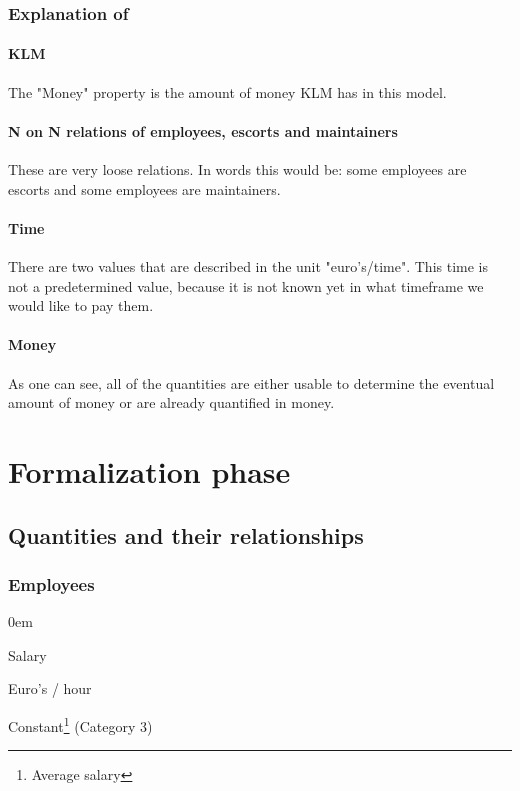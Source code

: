 \documentclass[a4paper, 11pt, notitlepage]{report}
\begin{document}
\subsection{Explanation of}
\subsubsection{KLM}
The "Money" property is the amount of money KLM has in this model.

\subsubsection{N on N relations of employees, escorts and maintainers}
These are very loose relations. In words this would be: some employees are escorts and some employees are maintainers.

\subsubsection{Time}
There are two values that are described in the unit "euro's/time". This time is not a predetermined value, because it is not known yet in what timeframe we would like to pay them.

\subsubsection{Money}
As one can see, all of the quantities are either usable to determine the eventual amount of money or are already quantified in money.

\chapter{Formalization phase}
\section{Quantities and their relationships}
	\subsection{Employees}
	\begin{description}
	\itemsep0em
	\item[Property:] Salary
	\item[Unit:] Euro's / hour
	\item[Role:] Constant\footnote{Average salary}  (Category 3)
	\end{description}
\end{document}
